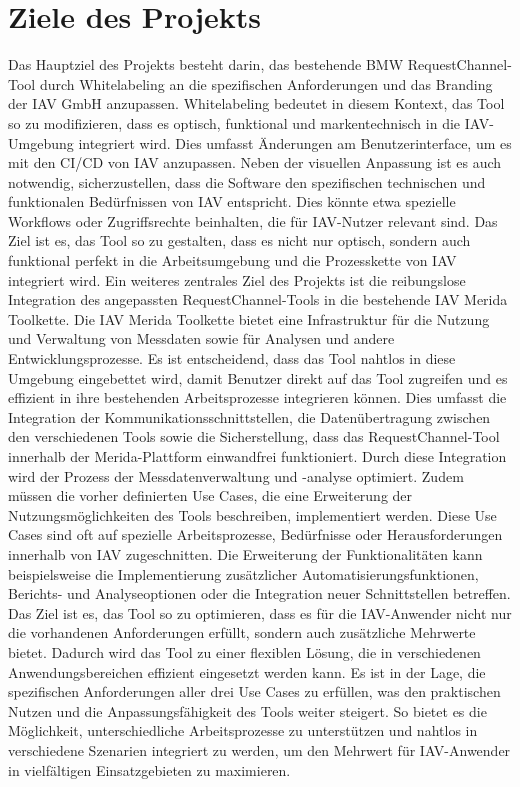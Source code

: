 \section{Ziele des Projekts}
Das Hauptziel des Projekts besteht darin, das bestehende BMW RequestChannel-Tool durch Whitelabeling an die spezifischen Anforderungen und das Branding der IAV GmbH anzupassen. Whitelabeling bedeutet in diesem Kontext, das Tool so zu modifizieren, dass es optisch, funktional und markentechnisch in die IAV-Umgebung integriert wird. Dies umfasst Änderungen am Benutzerinterface, um es mit den \ac{CI/CD} von IAV anzupassen. Neben der visuellen Anpassung ist es auch notwendig, sicherzustellen, dass die Software den spezifischen technischen und funktionalen Bedürfnissen von IAV entspricht. Dies könnte etwa spezielle Workflows oder Zugriffsrechte beinhalten, die für IAV-Nutzer relevant sind. Das Ziel ist es, das Tool so zu gestalten, dass es nicht nur optisch, sondern auch funktional perfekt in die Arbeitsumgebung und die Prozesskette von IAV integriert wird.
\newline
\newline
Ein weiteres zentrales Ziel des Projekts ist die reibungslose Integration des angepassten RequestChannel-Tools in die bestehende IAV Merida Toolkette. Die IAV Merida Toolkette bietet eine Infrastruktur für die Nutzung und Verwaltung von Messdaten sowie für Analysen und andere Entwicklungsprozesse. Es ist entscheidend, dass das Tool nahtlos in diese Umgebung eingebettet wird, damit Benutzer direkt auf das Tool zugreifen und es effizient in ihre bestehenden Arbeitsprozesse integrieren können. Dies umfasst die Integration der Kommunikationsschnittstellen, die Datenübertragung zwischen den verschiedenen Tools sowie die Sicherstellung, dass das RequestChannel-Tool innerhalb der Merida-Plattform einwandfrei funktioniert. Durch diese Integration wird der Prozess der Messdatenverwaltung und -analyse optimiert.
\newline
\newline
Zudem müssen die vorher definierten Use Cases, die eine Erweiterung der Nutzungsmöglichkeiten des Tools beschreiben, implementiert werden. Diese Use Cases sind oft auf spezielle Arbeitsprozesse, Bedürfnisse oder Herausforderungen innerhalb von IAV zugeschnitten. Die Erweiterung der Funktionalitäten kann beispielsweise die Implementierung zusätzlicher Automatisierungsfunktionen, Berichts- und Analyseoptionen oder die Integration neuer Schnittstellen betreffen. Das Ziel ist es, das Tool so zu optimieren, dass es für die IAV-Anwender nicht nur die vorhandenen Anforderungen erfüllt, sondern auch zusätzliche Mehrwerte bietet. Dadurch wird das Tool zu einer flexiblen Lösung, die in verschiedenen Anwendungsbereichen effizient eingesetzt werden kann. Es ist in der Lage, die spezifischen Anforderungen aller drei Use Cases zu erfüllen, was den praktischen Nutzen und die Anpassungsfähigkeit des Tools weiter steigert. So bietet es die Möglichkeit, unterschiedliche Arbeitsprozesse zu unterstützen und nahtlos in verschiedene Szenarien integriert zu werden, um den Mehrwert für IAV-Anwender in vielfältigen Einsatzgebieten zu maximieren.
